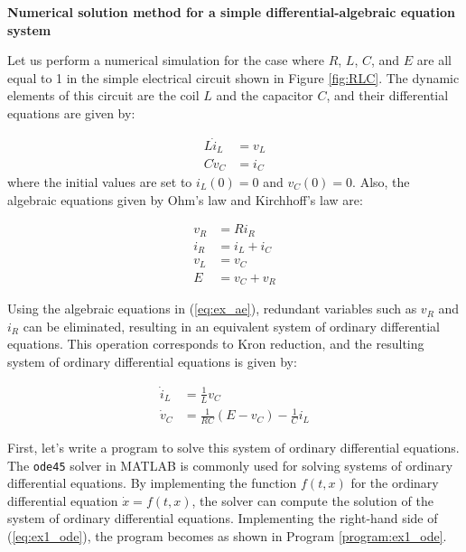 \documentclass[graybox, envcountchap]{svmult}
\begin{document}
\begin{example}{\textbf{Numerical solution method for a simple differential-algebraic
equation system}}\label{ex:dae_ex1}

Let us perform a numerical simulation for the case where $R$, $L$, $C$, and $E$
are all equal to 1 in the simple electrical circuit shown in Figure
\ref{fig:RLC}. The dynamic elements of this circuit are the coil $L$ and the
capacitor $C$, and their differential equations are given by:

\begin{subequations}\label{eq:ex_de}
  \begin{align}
    L\dot i_L & = v_L \\
    C\dot v_C & = i_C
  \end{align}
\end{subequations}
where the initial values are set to $i_L(0)=0$ and $v_C(0)=0$. Also, the
algebraic equations given by Ohm's law and Kirchhoff's law are:

\begin{subequations}\label{eq:ex_ae}
  \begin{align}
    v_R & = R i_R      \\
    i_R & = i_L + i_C \\
    v_L & = v_C       \\
    E   & = v_C + v_R
  \end{align}
\end{subequations}

Using the algebraic equations in (\ref{eq:ex_ae}), redundant variables such as
$v_R$ and $i_R$ can be eliminated, resulting in an equivalent system of ordinary
differential equations. This operation corresponds to Kron reduction, and the
resulting system of ordinary differential equations is given by:

\begin{subequations}\label{eq:ex1_ode}
  \begin{align}
    \dot{i}_L & = \frac{1}{L}v_C                     \\
    \dot{v}_C & = \frac{1}{RC}(E-v_C)-\frac{1}{C}i_L
  \end{align}
\end{subequations}

First, let's write a program to solve this system of ordinary differential
equations. The \verb|ode45| solver in MATLAB is commonly used for solving
systems of ordinary differential equations. By implementing the function
$f(t,x)$ for the ordinary differential equation $\dot{x} = f(t,x)$, the solver
can compute the solution of the system of ordinary differential equations.
Implementing the right-hand side of (\ref{eq:ex1_ode}), the program becomes as
shown in Program \ref{program:ex1_ode}.



\end{example}
\end{document}
